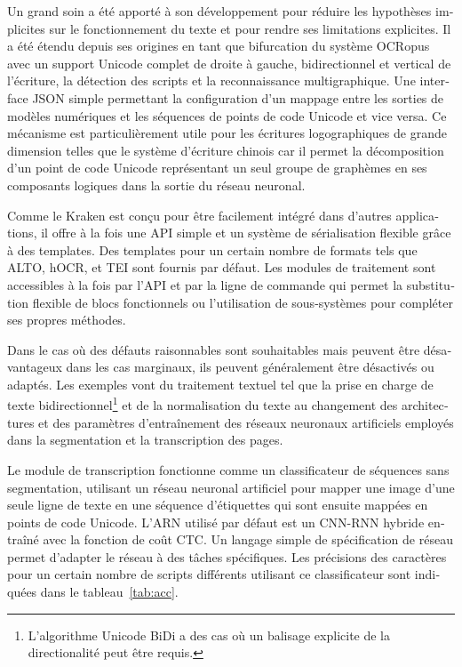 \begin{french}
Un grand soin a été apporté à son développement pour réduire les hypothèses
implicites sur le fonctionnement du texte et pour rendre ses limitations
explicites. Il a été étendu depuis ses origines en tant que bifurcation du
système OCRopus avec un support Unicode complet de droite à gauche,
bidirectionnel et vertical de l'écriture, la détection des scripts et la
reconnaissance multigraphique. Une interface JSON simple permettant la
configuration d'un mappage entre les sorties de modèles numériques et les
séquences de points de code Unicode et vice versa. Ce mécanisme est
particulièrement utile pour les écritures logographiques de grande dimension
telles que le système d'écriture chinois car il permet la décomposition d'un
point de code Unicode représentant un seul groupe de graphèmes en ses
composants logiques dans la sortie du réseau neuronal.

Comme le Kraken est conçu pour être facilement intégré dans d'autres
applications, il offre à la fois une API simple et un système de sérialisation
flexible grâce à des templates. Des templates pour un certain nombre de formats
tels que ALTO, hOCR, et TEI sont fournis par défaut. Les modules de traitement
sont accessibles à la fois par l'API et par la ligne de commande qui permet la
substitution flexible de blocs fonctionnels ou l'utilisation de sous-systèmes
pour compléter ses propres méthodes.

Dans le cas où des défauts raisonnables sont souhaitables mais peuvent être
désavantageux dans les cas marginaux, ils peuvent généralement être désactivés
ou adaptés. Les exemples vont du traitement textuel tel que la prise en charge
de texte bidirectionnel\footnote{L'algorithme Unicode BiDi a des cas où un
balisage explicite de la directionalité peut être requis.} et de la
normalisation du texte au changement des architectures et des paramètres
d'entraînement des réseaux neuronaux artificiels employés dans la segmentation
et la transcription des pages.

Le module de transcription fonctionne comme un classificateur de séquences sans
segmentation, utilisant un réseau neuronal artificiel pour mapper une image
d'une seule ligne de texte en une séquence d'étiquettes qui sont ensuite
mappées en points de code Unicode.  L'ARN utilisé par défaut est un CNN-RNN
hybride entraîné avec la fonction de coût CTC. Un langage simple de
spécification de réseau permet d'adapter le réseau à des tâches spécifiques.
Les précisions des caractères pour un certain nombre de scripts différents
utilisant ce classificateur sont indiquées dans le tableau~\ref{tab:acc}.


\end{french}
